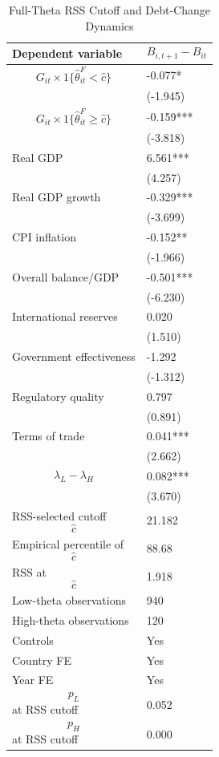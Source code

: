 \begin{table}[H]\centering
\begin{threeparttable}
\caption{Full-Theta RSS Cutoff and Debt-Change Dynamics}
\label{tab:deltaB_rss_cutoff_fulltheta}
\scriptsize
\begin{tabularx}{\textwidth}{lY}
\toprule
Dependent variable & $$B_{i,t+1}-B_{it}$$ \\
\midrule
$$G_{it}\times 1\{\widehat{\theta}^{F}_{it}<\widehat{c}\}$$ & -0.077* \\
 & (-1.945) \\
$$G_{it}\times 1\{\widehat{\theta}^{F}_{it}\geq\widehat{c}\}$$ & -0.159*** \\
 & (-3.818) \\
Real GDP & 6.561*** \\
 & (4.257) \\
Real GDP growth & -0.329*** \\
 & (-3.699) \\
CPI inflation & -0.152** \\
 & (-1.966) \\
Overall balance/GDP & -0.501*** \\
 & (-6.230) \\
International reserves & 0.020 \\
 & (1.510) \\
Government effectiveness & -1.292 \\
 & (-1.312) \\
Regulatory quality & 0.797 \\
 & (0.891) \\
Terms of trade & 0.041*** \\
 & (2.662) \\
$$\lambda_L-\lambda_H$$ & 0.082*** \\
 & (3.670) \\
\midrule
RSS-selected cutoff $$\widehat{c}$$ & 21.182 \\
Empirical percentile of $$\widehat{c}$$ & 88.68 \\
RSS at $$\widehat{c}$$ & 1.918 \\
Low-theta observations & 940 \\
High-theta observations & 120 \\
Controls & Yes \\
Country FE & Yes \\
Year FE & Yes \\
$$p_L$$ at RSS cutoff & 0.052 \\
$$p_H$$ at RSS cutoff & 0.000 \\

\end{tabularx}
\end{threeparttable}
\end{table}
